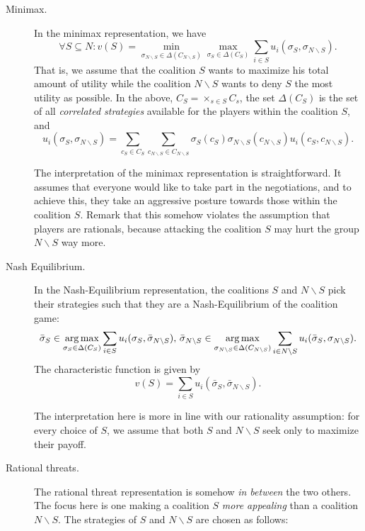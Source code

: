 \begin{description}
	\item[Minimax.] In the minimax representation, we have
	$$ \forall S \subseteq N: v(S) = \min_{\sigma_{N \backslash S} \in \Delta(C_{N \backslash S})} \max_{\sigma_{S} \in \Delta(C_{S})} \sum_{i \in S} u_i(\sigma_S, \sigma_{N \backslash S}). $$
	That is, we assume that the coalition $S$ wants to maximize his total amount of utility while the coalition $N \backslash S$ wants to deny $S$ the most utility as possible.
	In the above, $C_S = \times_{s \in S} C_s$, the set $\Delta(C_{S})$ is the set of all \emph{correlated strategies} available for the players within the coalition $S$, and
	$$ u_i(\sigma_S, \sigma_{N \backslash S}) = \sum_{c_S \in C_S} \sum_{c_{N \backslash S} \in C_{{N \backslash S}}} \sigma_S(c_S)\sigma_{N \backslash S}(c_{{N \backslash S}}) u_i(c_S, c_{N \backslash S}).$$

	The interpretation of the minimax representation is straightforward. It assumes that everyone would like to take part in the negotiations, and to achieve this, they take an aggressive posture towards those within the coalition $S$. Remark that this somehow violates the  assumption  that players are rationals, because attacking the coalition $S$ may hurt the group $N \backslash S$ way more.

	\item[Nash Equilibrium.] In the Nash-Equilibrium representation, the coalitions $S$ and $N \backslash S$ pick their strategies such that they are a Nash-Equilibrium of the coalition game:
	$$ \bar{\sigma}_S \in \operatorname*{arg\,max}_{\sigma_S \in \Delta(C_S)} \sum_{i \in S} u_i(\sigma_S, \bar{\sigma}_{N \backslash S}), \, \bar{\sigma}_{N \backslash S} \in \operatorname*{arg\,max}_{\sigma_{N \backslash S} \in \Delta(C_{N \backslash S})} \sum_{i \in {N \backslash S}} u_i(\bar{\sigma}_S, {\sigma}_{N \backslash S}).$$
 The characteristic function is given by
	$$v(S) = \sum_{i \in S} u_i(\bar{\sigma}_S, \bar{\sigma}_{N \backslash S}).$$

	The interpretation here	is more in line with our rationality assumption: for every choice of $S$, we assume that both $S$ and $N \backslash S$ seek only to maximize their payoff.

	\item[Rational threats.] The rational threat representation is somehow \emph{in between} the two others. The focus here is one making a coalition $S$ \emph{more appealing} than a coalition $N \backslash S$.
	The strategies of $S$ and $N \backslash S$ are chosen as follows:


\end{description}
